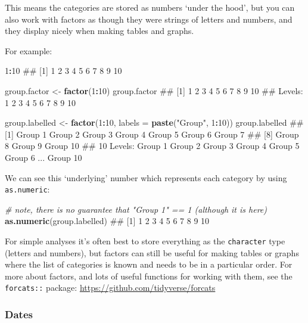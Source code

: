 \documentclass[]{article}
\newenvironment{Shaded}{\begin{snugshade}}{\end{snugshade}}
\newcommand{\KeywordTok}[1]{\textcolor[rgb]{0.13,0.29,0.53}{\textbf{#1}}}
\newcommand{\DataTypeTok}[1]{\textcolor[rgb]{0.13,0.29,0.53}{#1}}
\newcommand{\DecValTok}[1]{\textcolor[rgb]{0.00,0.00,0.81}{#1}}
\newcommand{\StringTok}[1]{\textcolor[rgb]{0.31,0.60,0.02}{#1}}
\newcommand{\CommentTok}[1]{\textcolor[rgb]{0.56,0.35,0.01}{\textit{#1}}}
\newcommand{\OperatorTok}[1]{\textcolor[rgb]{0.81,0.36,0.00}{\textbf{#1}}}
\newcommand{\NormalTok}[1]{#1}
\theoremstyle{definition}
\theoremstyle{definition}
\theoremstyle{definition}
\theoremstyle{remark}
\begin{document}
This means the categories are stored as numbers `under the hood', but
you can also work with factors as though they were strings of letters
and numbers, and they display nicely when making tables and graphs.

For example:

\begin{Shaded}
\begin{Highlighting}[]
\DecValTok{1}\OperatorTok{:}\DecValTok{10}
\NormalTok{##  [1]  1  2  3  4  5  6  7  8  9 10}

\NormalTok{group.factor <-}\StringTok{ }\KeywordTok{factor}\NormalTok{(}\DecValTok{1}\OperatorTok{:}\DecValTok{10}\NormalTok{)}
\NormalTok{group.factor}
\NormalTok{##  [1] 1  2  3  4  5  6  7  8  9  10}
\NormalTok{## Levels: 1 2 3 4 5 6 7 8 9 10}

\NormalTok{group.labelled <-}\StringTok{ }\KeywordTok{factor}\NormalTok{(}\DecValTok{1}\OperatorTok{:}\DecValTok{10}\NormalTok{, }\DataTypeTok{labels =} \KeywordTok{paste}\NormalTok{(}\StringTok{"Group"}\NormalTok{, }\DecValTok{1}\OperatorTok{:}\DecValTok{10}\NormalTok{))}
\NormalTok{group.labelled}
\NormalTok{##  [1] Group 1  Group 2  Group 3  Group 4  Group 5  Group 6  Group 7 }
\NormalTok{##  [8] Group 8  Group 9  Group 10}
\NormalTok{## 10 Levels: Group 1 Group 2 Group 3 Group 4 Group 5 Group 6 ... Group 10}
\end{Highlighting}
\end{Shaded}

We can see this `underlying' number which represents each category by
using \texttt{as.numeric}:

\begin{Shaded}
\begin{Highlighting}[]
\CommentTok{# note, there is no guarantee that "Group 1" == 1 (although it is here)}
\KeywordTok{as.numeric}\NormalTok{(group.labelled)}
\NormalTok{##  [1]  1  2  3  4  5  6  7  8  9 10}
\end{Highlighting}
\end{Shaded}

For simple analyses it's often best to store everything as the
\texttt{character} type (letters and numbers), but factors can still be
useful for making tables or graphs where the list of categories is known
and needs to be in a particular order. For more about factors, and lots
of useful functions for working with them, see the \texttt{forcats::}
package: \url{https://github.com/tidyverse/forcats}

\subsubsection*{Dates}\label{dates}
\end{document}
